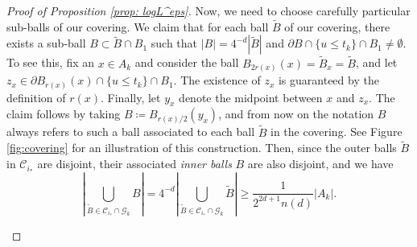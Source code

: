 \documentclass[reqno]{amsart}
\numberwithin{equation}{section}
\numberwithin{equation}{section}
\begin{document}
\begin{proof}[Proof of Proposition \ref{prop: logL^eps}]
Now, we need to choose carefully particular sub-balls of our covering. We claim that for each ball $\widetilde{B}$ of our covering, there exists a sub-ball $B \subset \widetilde{B} \cap B_1$ such that $|B| =4^{-d} |\widetilde{B}|$ and $\partial B \cap \{u \le t_k\} \cap B_1 \neq \emptyset$. To see this, fix an $x\in A_k$ and consider the ball $B_{2r(x)}(x) = \widetilde{B}_x = \widetilde{B}$, and let $z_x \in \partial B_{r(x)}(x) \cap \{u\le t_k\} \cap B_1$. The existence of $z_x$ is guaranteed by the definition of $r(x)$. Finally, let $y_x$ denote the midpoint between $x$  and $z_x$. The claim follows by taking $B \coloneqq B_{r(x)/2}(y_x)$, and from now on the notation $B$ always refers to such a ball associated to each ball $\widetilde{B}$ in the covering. See Figure \ref{fig:covering} for an illustration of this construction. Then, since the outer balls $\widetilde{B}$ in $\mathcal{C}_{i_*}$ are disjoint, their associated \textit{inner balls} $B$ are also disjoint, and we have
\begin{equation}
\label{eq: innerselection}
\left|\bigcup_{\widetilde B \in \mathcal{C}_{i_*} \cap \mathcal{G}_k}B\right|
=
4^{-d}
\left|\bigcup_{\widetilde B \in \mathcal{C}_{i_*} \cap \mathcal{G}_k}\widetilde B\right|
\ge
\frac{1}{2^{2d+1}n(d)}|A_k|.
\end{equation}

\begin{figure}[t]
    \centering
{}
\end{figure}
\end{proof}
\end{document}
